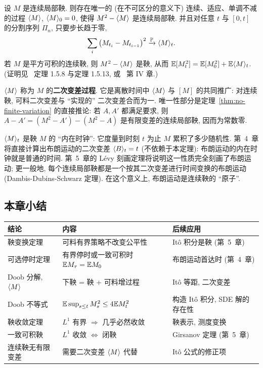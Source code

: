 \begin{theorem}[连续局部鞅的二次变差]\label{thm:quadratic-variation}
设 $M$ 是连续局部鞅. 则存在唯一的 (在不可区分的意义下) 连续、适应、单调不减的过程 $\langle M\rangle$, $\langle M\rangle_0=0$, 使得 $M^2-\langle M\rangle$ 是连续局部鞅. 并且对任意 $t$ 与 $[0,t]$ 的分割序列 $\Pi_n$, 只要步长趋于零,
\[
\sum_{i}\big(M_{t_i}-M_{t_{i-1}}\big)^2\xrightarrow{\mathbb{P}}\langle M\rangle_t.
\]
若 $M$ 是平方可积的连续鞅, 则 $M^2-\langle M\rangle$ 是鞅, 从而 $\mathbb{E}[M_t^2]=\mathbb{E}[M_0^2]+\mathbb{E}\langle M\rangle_t$. (证明见~\cite{karatzas} 定理 1.5.8 与定理 1.5.13, 或~\cite{revuz} 第 IV 章.)
\end{theorem}

$\langle M\rangle$ 称为 $M$ 的\textbf{二次变差过程}. 它是离散时间中 $\langle M\rangle$ 与 $[M]$ 的共同推广: 对连续鞅, 可料二次变差与 ``实现的'' 二次变差合而为一. 唯一性部分是定理~\ref{thm:no-finite-variation} 的直接推论: 若 $A,A'$ 都满足要求, 则 $A-A'=(M^2-A')-(M^2-A)$ 是有限变差的连续局部鞅, 因而为常数零.

\begin{intuition}
$\langle M\rangle_t$ 是鞅 $M$ 的 ``内在时钟'': 它度量到时刻 $t$ 为止 $M$ 累积了多少随机性. 第~4~章将直接计算出布朗运动的二次变差 $\langle B\rangle_t=t$ (不依赖于本定理): 布朗运动的内在时钟就是普通的时间. 第~5~章的 L\'evy 刻画定理将说明这一性质完全刻画了布朗运动; 更一般地, 每个连续局部鞅都是一个按其二次变差进行时间变换的布朗运动 (Dambis-Dubins-Schwarz 定理). 在这个意义上, 布朗运动是连续鞅的 ``原子''.
\end{intuition}

\subsection*{本章小结}

\begin{center}
\label{tab:ch3-summary}
\renewcommand{\arraystretch}{1.5}
\begin{tabular}{>{\raggedright\arraybackslash}p{} >{\raggedright\arraybackslash}p{} >{\raggedright\arraybackslash}p{}}
\toprule
结论 & 内容 & 后续应用 \\
\midrule
鞅变换定理 & 可料有界策略不改变公平性 & Itô 积分是鞅 (第~5~章) \\
可选停时定理 & 有界停时或一致可积时 $\mathbb{E} M_\tau=\mathbb{E} M_0$ & 布朗运动首达时 (第~4~章) \\
Doob 分解, $\langle M\rangle$ & 下鞅 = 鞅 + 可料增过程 & Itô 等距, 二次变差 \\
Doob 不等式 & $\mathbb{E}\sup_{s\le t}M_s^2\le4\mathbb{E} M_t^2$ & 构造 Itô 积分, SDE 解的存在性 \\
鞅收敛定理 & $L^1$ 有界 $\Rightarrow$ 几乎必然收敛 & 鞅表示, 测度变换 \\
一致可积鞅 & $L^1$ 收敛 $\iff$ 闭鞅 & Girsanov 定理 (第~5~章) \\
连续鞅无有限变差 & 需要二次变差 $\langle M\rangle$ 代替 & Itô 公式的修正项 \\
\bottomrule
\end{tabular}
\end{center}
